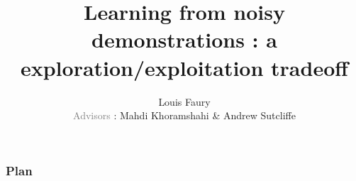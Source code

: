 \documentclass[t]{beamer}
\begin{document}
\title[Learning from noisy demonstrations : a exploration/exploitation tradeoff]{Learning from noisy demonstrations : a exploration/exploitation tradeoff}
\author[]{Louis Faury\\ \vspace{5pt} \small{\textcolor{gray}{Advisors} : Mahdi Khoramshahi \& Andrew Sutcliffe}}
\newenvironment{subenv}{\only{\setbeamercolor{local structure}{fg=red}}}{}

\titlepage

\begin{frame}[t]
	\vspace{-3ex}
	\frametitle{Plan}
  	\tableofcontents
\end{frame}
\end{document}
